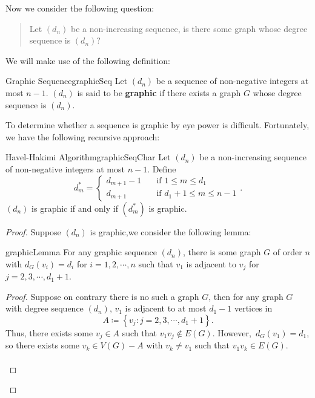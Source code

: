 \documentclass[math]{amznotes}
\theoremstyle{remark}
\newcommand{\0}{\mathbf{0}}
\newcommand{\1}{\mathbf{1}}
\begin{document}
Now we consider the following question:
\begin{quote}
    Let $(d_n)$ be a non-increasing sequence, is there some graph whose degree sequence is $(d_n)$?
\end{quote}
We will make use of the following definition:
\begin{dfnbox}{Graphic Sequence}{graphicSeq}
    Let $(d_n)$ be a sequence of non-negative integers at most $n - 1$. $(d_n)$ is said to be {\color{red} \textbf{graphic}} if there exists a graph $G$ whose degree sequence is $(d_n)$.
\end{dfnbox}
To determine whether a sequence is graphic by eye power is difficult. Fortunately, we have the following recursive approach:
\begin{thmbox}{Havel-Hakimi Algorithm}{graphicSeqChar}
    Let $(d_n)$ be a non-increasing sequence of non-negative integers at most $n - 1$. Define
    \begin{equation*}
        d^*_m = \begin{cases}
            d_{m + 1} - 1 & \quad\textrm{if } 1 \leq m \leq d_1 \\
            d_{m + 1} & \quad\textrm{if } d_1 + 1 \leq m \leq n - 1
        \end{cases}.
    \end{equation*}
    $(d_n)$ is graphic if and only if $\left(d^*_m\right)$ is graphic.
    \tcblower
    \begin{proof}
        Suppose $(d_n)$ is graphic,we consider the following lemma:
        \begin{lembox}{}{graphicLemma}
            For any graphic sequence $(d_n)$, there is some graph $G$ of order $n$ with $d_G(v_i) = d_i$ for $i = 1, 2, \cdots, n$ such that $v_1$ is adjacent to $v_j$ for $j = 2, 3, \cdots, d_1 + 1$.
            \tcblower
            \begin{proof}
                Suppose on contrary there is no such a graph $G$, then for any graph $G$ with degree sequence $(d_n)$, $v_1$ is adjacent to at most $d_1 - 1$ vertices in
                \begin{equation*}
                    A \coloneqq \left\{v_j \colon j = 2, 3, \cdots, d_1 + 1\right\}.
                \end{equation*}
                Thus, there exists some $v_j \in A$ such that $v_1v_j \notin E(G)$. However,~$d_G(v_1) = d_1$, so there exists some $v_k \in V(G) - A$ with $v_k \neq v_1$ such that $v_1v_k \in E(G)$.
                \\\\

\end{proof}
\end{lembox}
\end{proof}
\end{thmbox}
\end{document}
